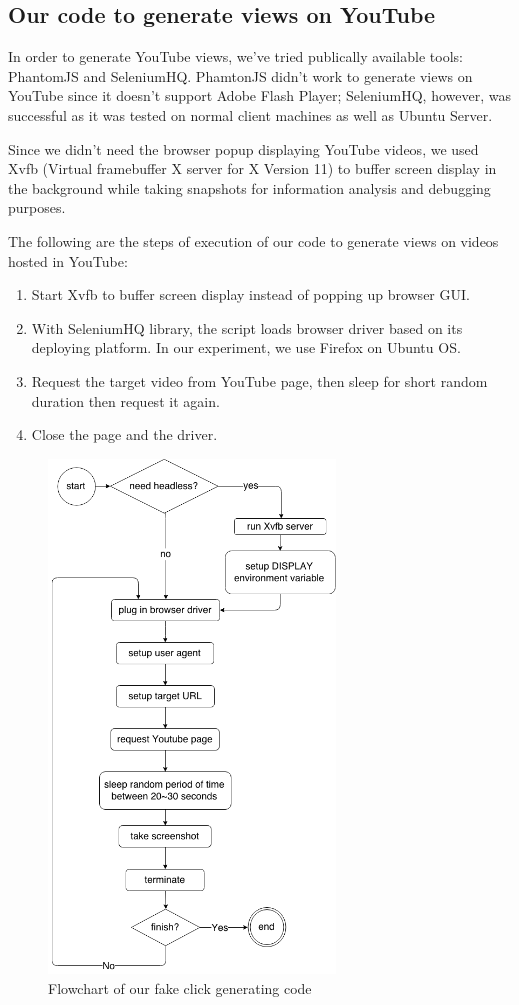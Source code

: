 \documentclass[conference]{IEEEtran}
\begin{document}
\subsection{Our code to generate views on YouTube}

In order to generate YouTube views, we've tried publically available tools: PhantomJS and SeleniumHQ. PhamtonJS didn't work to generate views on YouTube since it doesn't support Adobe Flash Player; SeleniumHQ, however, was successful as it was tested on normal client machines as well as Ubuntu Server.

Since we didn't need the browser popup displaying YouTube videos, we used Xvfb (Virtual framebuffer X server for X Version 11) to buffer screen display in the background while taking snapshots for information analysis and debugging purposes.

The following are the steps of execution of our code to generate views on videos hosted in YouTube:

\begin{enumerate}
  \item Start Xvfb to buffer screen display instead of popping up browser GUI.
  \item With SeleniumHQ library, the script loads browser driver based on its deploying platform. In our experiment, we use Firefox on Ubuntu OS.
  \item Request the target video from YouTube page, then sleep for short random duration then request it again.
  \item Close the page and the driver.
\end{enumerate}

\begin{figure}[h]
  \centering
  \includegraphics[width=3.0in]{flowchart}
  \caption{Flowchart of our fake click generating code}
\end{figure}
\end{document}
